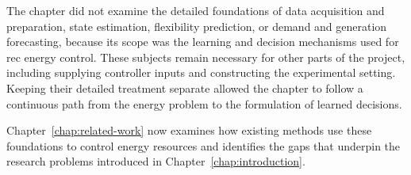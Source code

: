 The chapter did not examine the detailed foundations of data acquisition and preparation, state estimation, flexibility prediction, or demand and generation forecasting, because its scope was the learning and decision mechanisms used for \gls{rec} energy control. These subjects remain necessary for other parts of the project, including supplying controller inputs and constructing the experimental setting. Keeping their detailed treatment separate allowed the chapter to follow a continuous path from the energy problem to the formulation of learned decisions.

Chapter~\ref{chap:related-work} now examines how existing methods use these foundations to control energy resources and identifies the gaps that underpin the research problems introduced in Chapter~\ref{chap:introduction}.

\clearpage
\endgroup
